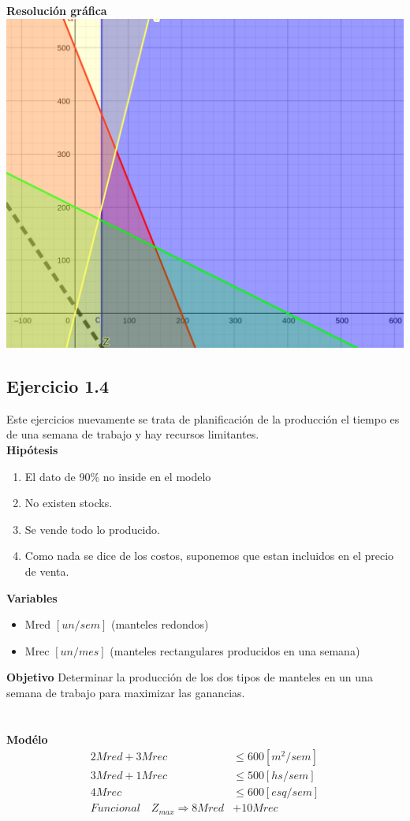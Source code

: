 \documentclass[12pt]{book}
\begin{document}
\begin{center}
\textbf{Resoluci\'on gr\'afica}
\includegraphics[scale=.3]{./img/13.png}
\end{center}




\subsection{Ejercicio 1.4}
Este ejercicios nuevamente se trata de planificación de la producción el tiempo es de una semana de trabajo y hay recursos limitantes.
\\
\textbf{Hipótesis}
\begin{enumerate} 
\item El dato de 90\% no inside en el modelo
\item No existen stocks.
\item Se vende todo lo producido.
\item Como nada se dice de los costos, suponemos que estan incluidos en el precio de venta.
\end{enumerate}

\textbf{Variables}
\begin{itemize}
\item Mred $[un/sem]$ (manteles redondos)
\item Mrec $[un/mes]$ (manteles rectangulares producidos en una semana)
\end{itemize}

\textbf{Objetivo}
Determinar la producción de los dos tipos de manteles en un una semana de trabajo para maximizar las ganancias.
\\ \\ \\
\textbf{Modélo}
\begin{align*}
2 Mred + 3 Mrec &\leq 600 [m^2/sem] \\
3 Mred + 1 Mrec &\leq 500 [hs/sem] \\
4 Mrec &\leq 600[esq/sem] \\
Funcional \quad Z_{max} \Rightarrow  8 Mred &+ 10 Mrec
\end{align*}
\end{document}
